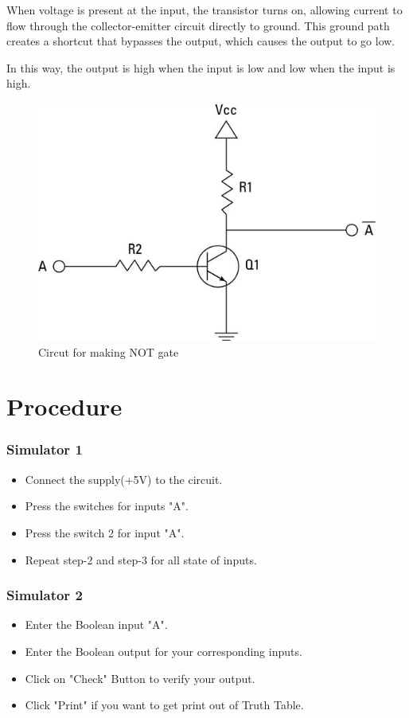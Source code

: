 	When voltage is present at the input, the transistor turns on, allowing current to flow through the collector-emitter circuit directly to ground. This ground path creates a shortcut that bypasses the output, which causes the output to go low.
	
	In this way, the output is high when the input is low and low when the input is high.
			
	\begin{figure}[h]
		\centering
		\includegraphics[width=0.3\linewidth]{img/exp3/3}
		\caption{Circut for making NOT gate}
		\label{fig:3:3}
	\end{figure}
			
\section{Procedure}
	\subsubsection{Simulator 1}
	\begin{itemize}
		\tightlist
		\item Connect the supply(+5V) to the circuit.
		\item Press the switches for inputs "A".
		\item Press the switch 2 for input "A".
		\item Repeat step-2 and step-3 for all state of inputs.
	\end{itemize}

	\subsubsection{Simulator 2}
	\begin{itemize}
		\tightlist
		\item Enter the Boolean input "A".
		\item Enter the Boolean output for your corresponding inputs.
		\item Click on "Check" Button to verify your output.
		\item Click "Print" if you want to get print out of Truth Table.
	\end{itemize}


